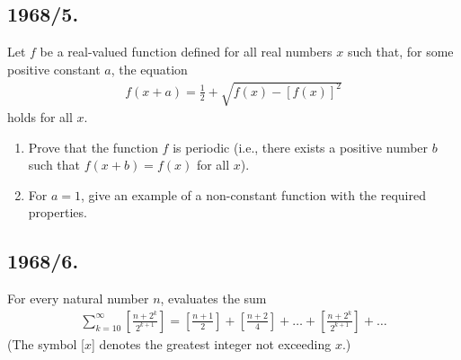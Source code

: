 \documentclass{article}
\begin{document}
\subsection*{1968/5.}
Let $f$ be a real-valued function defined for all real numbers $x$ such that, for some positive constant $a$, the equation
		\begin{align}
			f(x + a) = \frac{1}{2}+\sqrt{f(x)-[f(x)]^{2}}
		\end{align}
		\noindent holds for all $x$.
		\begin{enumerate}
			\item Prove that the function $f$ is periodic (i.e., there exists a positive number $b$ such that $f(x + b) = f(x)$ for all $x$).
			\item For $a = 1$, give an example of a non-constant function with the required properties.
		\end{enumerate}

\subsection*{1968/6.}
For every natural number $n$, evaluates the sum
		\begin{align}
			\sum\limits_{k=10}^{\infty} [\frac{n + 2^{k}}{2^{k+1}}] = [\frac{n + 1}{2}] + [\frac{n + 2}{4}] +\hdots+ [\frac{n + 2^{k}}{2^{k+1}}] +\hdots
		\end{align}
		\noindent (The symbol [$x$] denotes the greatest integer not exceeding $x$.)
\end{document}
